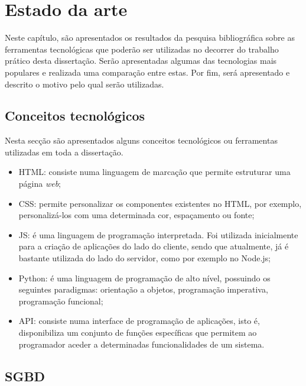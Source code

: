 \chapter{Estado da arte}
\label{state}


Neste capítulo, são apresentados os resultados da pesquisa bibliográfica sobre as ferramentas tecnológicas que poderão ser utilizadas no decorrer do trabalho prático desta dissertação. Serão apresentadas algumas das tecnologias mais populares e realizada uma comparação entre estas. Por fim, será apresentado e descrito o motivo pelo qual serão utilizadas. 
 


\section{Conceitos tecnológicos}


Nesta secção são apresentados alguns conceitos tecnológicos ou ferramentas utilizadas em toda a dissertação. 

\begin{itemize}
	\item \ac{HTML}: consiste numa linguagem de marcação que permite estruturar uma página \textit{web}; 
	
	\item \ac{CSS}: permite personalizar os componentes existentes no \linebreak \ac{HTML}, por exemplo, personalizá-los com uma determinada cor,  espaçamento ou fonte;  
	
	\item \ac{JS}: é uma linguagem de programação interpretada. Foi utilizada inicialmente para a criação de aplicações do lado do cliente, sendo que atualmente, já é bastante utilizada do lado do servidor, como por exemplo no Node.js; 
	
	\item Python: é uma  linguagem de programação de alto nível, possuindo os seguintes paradigmas:  orientação a objetos, programação imperativa, programação funcional;  
	
	
	\item \ac{API}: consiste numa interface de programação de aplicações, isto é, disponibiliza um conjunto de funções específicas que permitem ao programador aceder a determinadas funcionalidades de um sistema.  
	
\end{itemize}



\section{\acl{SGBD}}

